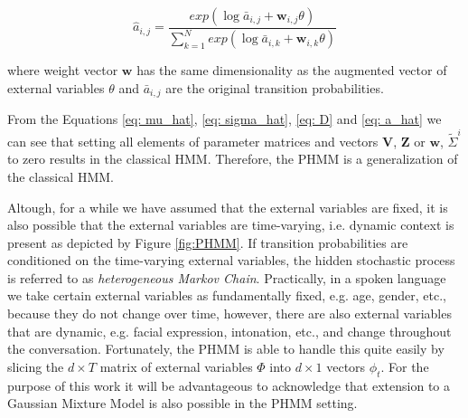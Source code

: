 \begin{equation} \label{eq: a_hat}
    \hat{a}_{i,j} = \frac{exp(\log \bar{a}_{i,j} + \textbf{w}_{i,j} \theta)}{\sum_{k=1}^{N} exp(\log \bar{a}_{i,k} + \textbf{w}_{i,k} \theta)}
\end{equation}

where weight vector $\textbf{w}$ has the same dimensionality as the augmented vector of external variables $\theta$ and $\bar{a}_{i,j}$ are the original 
transition probabilities. \citep{Radenen2014}

From the Equations \ref{eq: mu_hat}, \ref{eq: sigma_hat}, \ref{eq: D} and \ref{eq: a_hat} we can see that setting all elements of parameter matrices and vectors $\textbf{V}$, $\textbf{Z}$ or $\textbf{w}$, $\widetilde{\Sigma}^i$ to zero
results in the classical HMM. Therefore, the PHMM is a generalization of the classical HMM. \citep{Radenen2014}

Altough, for a while we have assumed that the external variables are fixed, it is also possible that the external variables are time-varying, i.e. dynamic context is present as depicted by Figure \ref{fig:PHMM}. 
If transition probabilities are conditioned on the time-varying external variables, the hidden stochastic process is referred to as \textit{heterogeneous Markov Chain}.
Practically, in a spoken language we take certain external variables as fundamentally fixed, e.g. age, gender, etc., because they do not change over time, however, there are also external variables that
are dynamic, e.g. facial expression, intonation, etc., and change throughout the conversation. Fortunately, the PHMM is able to handle this quite easily by slicing the $d \times T$ matrix of external variables $\Phi$ 
into $d \times 1$ vectors $\phi_t$. For the purpose of this work it will be advantageous to acknowledge that extension to a Gaussian Mixture Model 
is also possible in the PHMM setting. \citep{Radenen2014}

